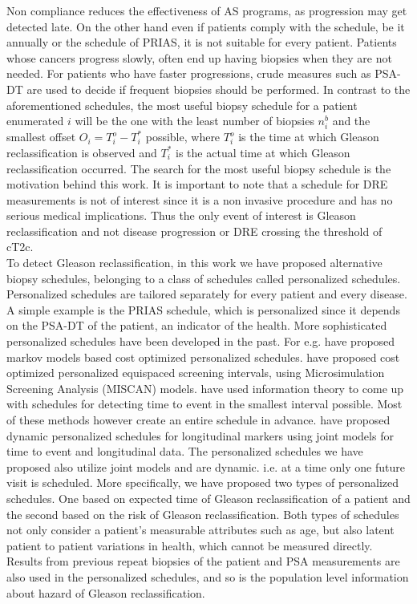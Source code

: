 Non compliance reduces the effectiveness of AS programs, as progression may get detected late. On the other hand even if patients comply with the schedule, be it annually or the schedule of PRIAS, it is not suitable for every patient. Patients whose cancers progress slowly, often end up having biopsies when they are not needed. For patients who have faster progressions, crude measures such as PSA-DT are used to decide if frequent biopsies should be performed. In contrast to the aforementioned schedules, the most useful biopsy schedule for a patient enumerated $i$ will be the one with the least number of biopsies $n_i^b$ and the smallest offset $O_i = T_i^o - T_i^*$ possible, where $T_i^o$ is the time at which Gleason reclassification is observed and $T_i^*$ is the actual time at which Gleason reclassification occurred. The search for the most useful biopsy schedule is the motivation behind this work. It is important to note that a schedule for DRE measurements is not of interest since it is a non invasive procedure and has no serious medical implications. Thus the only event of interest is Gleason reclassification and not disease progression or DRE crossing the threshold of cT2c.\\

To detect Gleason reclassification, in this work we have proposed alternative biopsy schedules, belonging to a class of schedules called personalized schedules. Personalized schedules are tailored separately for every patient and every disease. A simple example is the PRIAS schedule, which is personalized since it depends on the PSA-DT of the patient, an indicator of the health. More sophisticated personalized schedules have been developed in the past. For e.g. \cite{bebu2017OptimalScreening} have proposed markov models based cost optimized personalized schedules. \cite{oMahonyOptimaInterval} have proposed cost optimized personalized equispaced screening intervals, using Microsimulation Screening Analysis (MISCAN) models. \cite{parmigiani1998designing} have used information theory to come up with schedules for detecting time to event in the smallest interval possible. Most of these methods however create an entire schedule in advance. \cite{drizopoulosPersScreening} have proposed dynamic personalized schedules for longitudinal markers using joint models for time to event and longitudinal data\citep{tsiatis2004joint,rizopoulos2012joint}. The personalized schedules we have proposed also utilize joint models and are dynamic. i.e. at a time only one future visit is scheduled. More specifically, we have proposed two types of personalized schedules. One based on expected time of Gleason reclassification of a patient and the second based on the risk of Gleason reclassification. Both types of schedules not only consider a patient's measurable attributes such as age, but also latent patient to patient variations in health, which cannot be measured directly. Results from previous repeat biopsies of the patient and PSA measurements are also used in the personalized schedules, and so is the population level information about hazard of Gleason reclassification.\\

